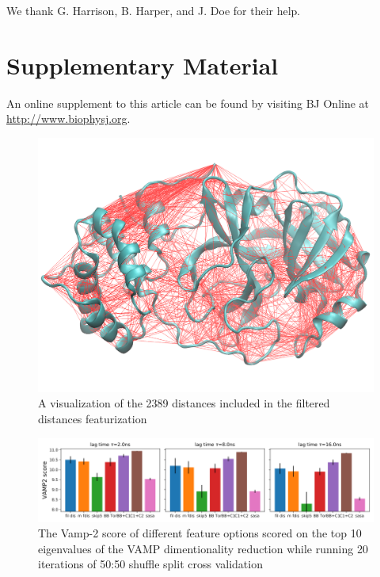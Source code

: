 \documentclass{biophys-new}
\begin{document}
We thank G. Harrison, B. Harper, and J. Doe for their help.




\section*{Supplementary Material}

An online supplement to this article can be found by visiting BJ Online at \url{http://www.biophysj.org}.

\begin{figure}[hbt!]
\centering
\includegraphics[width=0.6\linewidth]{supplemental_figures/fdis-visualization_smaller.png}
\caption{A visualization of the 2389 distances included in the filtered distances featurization}
\label{fig:view}
\end{figure}

\begin{figure}[hbt!]
\centering
\includegraphics[width=0.6\linewidth]{supplemental_figures/sup_fig_2_vamp_score.png}
\caption{The Vamp-2 score of different feature options scored on the top 10 eigenvalues of the VAMP dimentionality reduction while running 20 iterations of 50:50 shuffle split cross validation}
\label{fig:view}
\end{figure}
\end{document}
